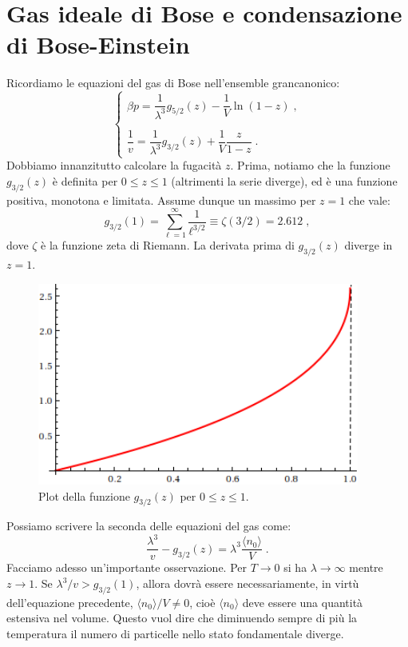 \documentclass[10pt,a4paper]{report}
\theoremstyle{definition}
\numberwithin{equation}{section}
\newcommand{\bra}{\langle}
\newcommand{\ket}{\rangle}
\begin{document}
\section{Gas ideale di Bose e condensazione di Bose-Einstein}
Ricordiamo le equazioni del gas di Bose nell'ensemble grancanonico:
$$
\begin{cases}
\beta p=\dfrac{1}{\lambda^3}g_{5/2}(z)-\dfrac{1}{V}\ln(1-z)\;, \\
\\
\dfrac{1}{v}=\dfrac{1}{\lambda^3}g_{3/2}(z)+\dfrac{1}{V}\dfrac{z}{1-z}\;.
\end{cases}
$$
Dobbiamo innanzitutto calcolare la fugacità $z$. Prima, notiamo che la funzione $g_{3/2}(z)$ è definita per $0\le z\le 1$ (altrimenti la serie diverge), ed è una funzione positiva, monotona e limitata. Assume dunque un massimo per $z=1$ che vale:
\begin{equation}
g_{3/2}(1)=\sum_{\ell=1}^{\infty}\frac{1}{\ell^{3/2}}\equiv\zeta(3/2)=2.612\;,
\end{equation}
dove $\zeta$ è la funzione zeta di Riemann. La derivata prima di $g_{3/2}(z)$ diverge in $z=1$. 
\begin{figure}[h]
\centering
\includegraphics[width=300pt,keepaspectratio=true]{Addons/g32}
\caption{Plot della funzione $g_{3/2}(z)$ per $0\le z\le 1$.}

\end{figure}
\cleardoublepage
Possiamo scrivere la seconda delle equazioni del gas come:
\begin{equation}
\frac{\lambda^3}{v}-g_{3/2}(z)=\lambda^3\frac{\bra n_0\ket}{V}\;.
\end{equation}
Facciamo adesso un'importante osservazione. Per $T\to 0$ si ha $\lambda\to\infty$ mentre $z\to 1$. Se $\lambda^3/v>g_{3/2}(1)$, allora dovrà essere necessariamente, in virtù dell'equazione precedente, $\bra n_0\ket/V\ne 0$, cioè $\bra n_0\ket$ deve essere una quantità estensiva nel volume. Questo vuol dire che diminuendo sempre di più la temperatura il numero di particelle nello stato fondamentale diverge. \\
\end{document}
